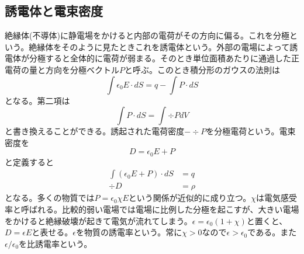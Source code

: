 \subsection{誘電体と電束密度}
    絶縁体(不導体)に静電場をかけると内部の電荷がその方向に偏る。これを分極という。絶縁体をそのように見たときこれを誘電体という。外部の電場によって誘電体が分極すると全体的に電荷が弱まる。そのとき単位面積あたりに通過した正電荷の量と方向を分極ベクトル$P$と呼ぶ。このとき積分形のガウスの法則は
        \[\int \epsilon_0 E \cdot dS = q - \int P \cdot dS\]
    となる。第二項は
        \[\int P \cdot dS = \int \div P dV\]
    と書き換えることができる。誘起された電荷密度$-\div P$を分極電荷という。電束密度を
        \[D = \epsilon_0 E + P\]
    と定義すると
    \begin{align*}
        \int (\epsilon_0 E + P) \cdot dS &= q\\
        \div D &= \rho
    \end{align*}
    となる。多くの物質では$P = \epsilon_0\chi E$という関係が近似的に成り立つ。$\chi$は電気感受率と呼ばれる。比較的弱い電場では電場に比例した分極を起こすが、大きい電場をかけると絶縁破壊が起きて電気が流れてしまう。$\epsilon = \epsilon_0(1 + \chi)$と置くと、$D = \epsilon E$と表せる。$\epsilon$を物質の誘電率という。常に$\chi > 0$なので$\epsilon > \epsilon_0$である。また$\epsilon / \epsilon_0$を比誘電率という。

